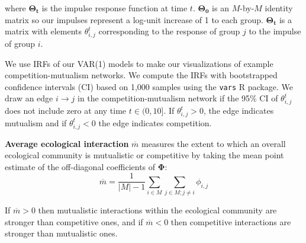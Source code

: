 \documentclass[letterpaper]{article}\usepackage[]{graphicx}\usepackage[]{color}
\begin{document}
\noindent where $\mathbf{\Theta_t}$ is the impulse response function at time $t$.   $\mathbf{\Theta_0}$ is an $M$-by-$M$ identity matrix so our impulses represent a log-unit increase of 1 to each group. $\mathbf{\Theta_t}$ is a matrix with elements $\theta^t_{i,j}$ corresponding to the response of group $j$ to the impulse of group $i$.  


We use IRFs of our VAR(1) models to make our visualizations of example competition-mutualism networks. 
We compute the IRFs with bootstrapped confidence intervals (CI) based on 1,000 samples using the \texttt{vars} R package. We draw an edge $i \rightarrow j$ in the competition-mutualism network if the 95\% CI of $\theta^t_{i,j}$ does not include zero at any time $t \in (0,10]$.  If $\theta^t_{i,j} >0 $, the edge indicates mutualism and if  $\theta^t_{i,j} < 0$  the edge indicates competition.




\vspace{0.8em}
\noindent \textbf{Average ecological interaction}
$\overline{m}$ measures the extent to which an overall ecological community is mutualistic or competitive by taking the mean point estimate of the off-diagonal coefficients of $\mathbf{\Phi}$:%
\begin{equation}\label{eq:average.interaction}
\overline{m} = \frac{1}{\left|M\right| - 1} \sum_{i\in M} \sum_{j\in M;j\ne i} \phi_{i,j}
\end{equation}

\noindent If $\overline{m} > 0$ then mutualistic interactions within the ecological community are stronger than competitive ones, and if $\overline{m} < 0$ then competitive interactions are stronger than mutualistic ones.
\end{document}
